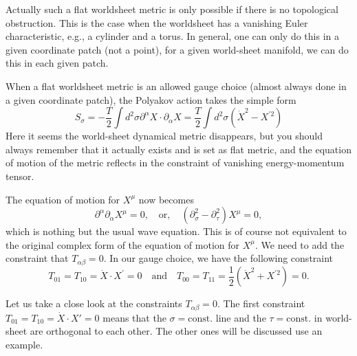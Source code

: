 \documentclass[graybox,envcountchap,sectrefs]{svmono}
\begin{document}
Actually such a flat worldsheet metric is only possible if there is no topological obstruction. This is the case when the worldsheet has a vanishing Euler characteristic, e.g., a cylinder and a torus. In general, one can only do this in a given coordinate patch (not a point), for a given world-sheet manifold, we can do this in each given patch.

When a flat worldsheet metric is an allowed gauge choice (almost always done in a given coordinate patch), the Polyakov action takes the simple form
\begin{equation}
S_{\sigma}=-\frac{T}{2} \int d^{2} \sigma \partial^{\alpha} X \cdot \partial_{\alpha} X=\frac{T}{2} \int d^{2} \sigma\left(\dot{X}^{2}-X^{\prime 2}\right)
\end{equation}
Here it seems the world-sheet dynamical metric disappears, but you should always remember that it actually exists and is set as flat metric, and the equation of motion of the metric reflects in the constraint of vanishing energy-momentum tensor.

The equation of motion for $X^{\mu}$ now becomes 
\begin{equation}
\partial^{\alpha}\partial_{\alpha}X^{\mu}=0, \quad \text{or}, \quad  \left(\partial_{\sigma}^2-\partial_{\tau}^2\right)X^{\mu}=0,
\end{equation}
which is nothing but the usual wave equation.
This is of course not equivalent to the original complex form of the equation of motion for $X^{\mu}$.
We need to add the constraint that $T_{\alpha\beta}=0$. In our gauge choice, we have the following constraint
\begin{equation}
T_{01}=T_{10}=\dot{X} \cdot X^{\prime}=0 \quad \text{and} \quad T_{00}=T_{11}=\frac{1}{2}\left(\dot{X}^{2}+X^{\prime 2}\right)=0.	
\end{equation}

Let us take a close look at the constraints $T_{\alpha\beta}=0$.
The first constraint $T_{01}=T_{10}=\dot{X}\cdot X'=0$ means that the $\sigma=\text{const.}$ line and the $\tau=\text{const.}$ in world-sheet are orthogonal to each other. The other ones will be discussed use an example.
\end{document}
